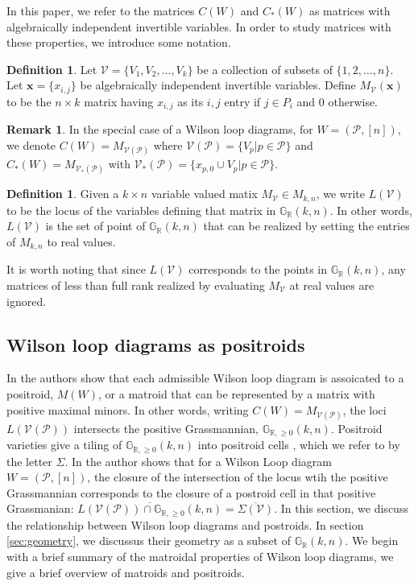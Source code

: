 \documentclass[11pt]{article}
\newcommand{\R}{\mathbb{R}}
\newcommand{\Gr}{\mathbb{G}_{\R, \geq 0}}
\newcommand{\Grall}{\mathbb{G}_{\R}}
\newcommand{\cP}{\mathcal{P}}
\newcommand{\cV}{\mathcal{V}}
\newcommand{\VP}{\cV(\cP)}
\newcommand{\VPs}{\cV_*(\cP)}
\theoremstyle{remark}
\theoremstyle{definition}
\newtheorem{dfn}[thm]{Definition}
\newtheorem{rmk}[thm]{Remark}
\begin{document}
In this paper, we refer to the matrices $C(W)$ and $C_*(W)$ as matrices with algebraically independent invertible variables. In order to study matrices with these properties, we introduce some notation.

\begin{dfn} \label{dfn:variablevaluedmatrix}
Let $\mathcal{V} = \{V_1, V_2, \dots, V_k\}$ be a collection of subsets of $\{1,2,\dots,n\}$. Let $\mathbf{x}=\{x_{i,j}\}$ be algebraically independent invertible variables. Define $M_{\mathcal{V}}(\mathbf{x})$ to be the $n \times k$ matrix having $x_{i,j}$ as its $i,j$ entry if $j \in P_i$ and $0$ otherwise.
\end{dfn}

\begin{rmk}\label{rmk:C(W)notation}In the special case of a Wilson loop diagrams, for $W = (\cP, [n])$, we denote $C(W) = M_{\VP}$ where $\VP = \{V_p | p \in \cP\}$ and  $C_*(W) = M_{\VPs}$ with $\VPs = \{x_{p,0} \cup V_p | p \in \cP\}$.\end{rmk}

\begin{dfn}
Given a $k \times n$ variable valued matix $M_\cV \in M_{k,n}$, we write $L(\cV)$ to be the locus of the variables defining that matrix in $\Grall(k,n)$. In other words, $L(\cV)$ is the set of point of $\Grall(k,n)$ that can be realized by setting the entries of $M_{k,n}$ to real values.
\end{dfn}

It is worth noting that since $L(\cV)$ corresponds to the points in $\Grall(k,n)$, any matrices of less than full rank realized by evaluating $M_{\cV}$ at real values are ignored.

\subsection{Wilson loop diagrams as positroids \label{sec:WLDmatroid}}

In \cite{Wilsonloop} the authors show that each admissible Wilson loop diagram is assoicated to a positroid, $M(W)$, or a matroid that can be represented by a matrix with positive maximal minors. In other words, writing $C(W) = M_{\VP}$, the loci $L(\VP)$ intersects the positive Grassmannian, $\Gr(k,n)$. Positroid varieties give a tiling of $\Gr(k,n)$ into positroid cells \cite{??}, which we refer to by the letter $\Sigma$. In \cite[Theorem 8.4]{basisshapeloci} the author shows that for a Wilson Loop diagram $W = (\cP, [n])$, the closure of the intersection of the locus wtih the positive Grassmannian corresponds to the closure of a postroid cell in that positive Grassmanian: $\overline{L(\VP) \cap \Gr(k,n)} = \overline{\Sigma(\cV)}$. In this section, we discuss the relationship between Wilson loop diagrams and postroids. In section \ref{sec:geometry}, we discussus their geometry as a subset of $\Grall(k, n)$. We begin with a brief summary of the matroidal properties of Wilson loop diagrams, we give a brief overview of matroids and positroids.
\end{document}

